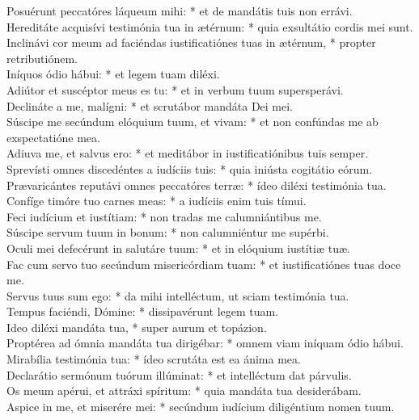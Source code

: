 {	Posuérunt peccatóres láqueum mihi: * et de mandátis tuis non errávi. \\
	Hereditáte acquisívi testimónia tua in ætérnum: * quia exsultátio cordis mei sunt. \\
	Inclinávi cor meum ad faciéndas iustificatiónes tuas in ætérnum, * propter retributiónem. \\
	Iníquos ódio hábui: * et legem tuam diléxi. \\
	Adiútor et suscéptor meus es tu: * et in verbum tuum supersperávi. \\
	Declináte a me, malígni: * et scrutábor mandáta Dei mei. \\
	Súscipe me secúndum elóquium tuum, et vivam: * et non confúndas me ab exspectatióne mea. \\
	Adiuva me, et salvus ero: * et meditábor in iustificatiónibus tuis semper. \\
	Sprevísti omnes discedéntes a iudíciis tuis: * quia iniústa cogitátio eórum. \\
	Prævaricántes reputávi omnes peccatóres terræ: * ídeo diléxi testimónia tua. \\
	Confíge timóre tuo carnes meas: * a iudíciis enim tuis tímui. \\
	Feci iudícium et iustítiam: * non tradas me calumniántibus me. \\
	Súscipe servum tuum in bonum: * non calumniéntur me supérbi. \\
	Oculi mei defecérunt in salutáre tuum: * et in elóquium iustítiæ tuæ. \\
	Fac cum servo tuo secúndum misericórdiam tuam: * et iustificatiónes tuas doce me. \\
	Servus tuus sum ego: * da mihi intelléctum, ut sciam testimónia tua. \\
	Tempus faciéndi, Dómine: * dissipavérunt legem tuam. \\
	Ideo diléxi mandáta tua, * super aurum et topázion. \\
	Proptérea ad ómnia mandáta tua dirigébar: * omnem viam iníquam ódio hábui. \\
	Mirabília testimónia tua: * ídeo scrutáta est ea ánima mea. \\
	Declarátio sermónum tuórum illúminat: * et intelléctum dat párvulis. \\
	Os meum apérui, et attráxi spíritum: * quia mandáta tua desiderábam. \\
	Aspice in me, et miserére mei: * secúndum iudícium diligéntium nomen tuum. \\
}
